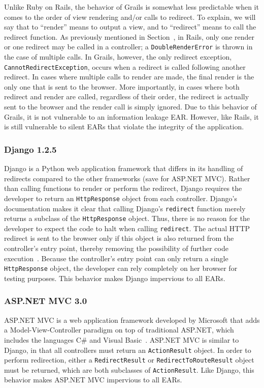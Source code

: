 Unlike Ruby on Rails, the behavior of Grails is somewhat less predictable
when it comes to the order of view rendering and/or calls to redirect. To
explain, we will say that to ``render'' means to output a view, and to
``redirect'' means to call the redirect function. As previously mentioned
in Section~, in Rails, only one render or one redirect may be
called in a controller; a \texttt{DoubleRenderError} is thrown in the case
of multiple calls. In Grails, however, the only redirect exception,
\texttt{CannotRedirectException}, occurs when a redirect is called
following another redirect. In cases where multiple calls to render are
made, the final render is the only one that is sent to the browser. More
importantly, in cases where both redirect and render are called, regardless
of their order, the redirect is actually sent to the browser and the render
call is simply ignored. Due to this behavior of Grails, it is not
vulnerable to an information leakage EAR. However, like Rails, it is still
vulnerable to silent EARs that violate the integrity of the application.

\subsubsection{Django 1.2.5}
Django is a Python web application framework that differs in its handling of
redirects compared to the other frameworks (save for ASP.NET
MVC). Rather than calling functions to render or perform the redirect, Django
requires the developer to return an \texttt{HttpResponse} object from each
controller. Django's documentation makes it clear that calling Django's
\texttt{redirect} function merely returns a subclass of the
\texttt{HttpResponse} object. Thus, there is no reason for the developer to
expect the code to halt when calling \texttt{redirect}. The actual HTTP
redirect is sent to the browser only if this object is also returned from the
controller's entry point, thereby removing the possibility of further code
execution~\cite{django-redirect}. Because the controller's entry
point can only return a single \texttt{HttpResponse} object, the developer can
rely completely on her browser for testing purposes. This behavior makes
Django impervious to all EARs.

\subsubsection{ASP.NET MVC 3.0}
ASP.NET MVC is a web application framework developed by Microsoft that adds a
Model-View-Controller paradigm on top of traditional ASP.NET, which includes
the languages C\# and Visual Basic~\cite{asp-net-mvc}. ASP.NET MVC is similar
to Django, in that all controllers must return an \texttt{ActionResult}
object. In order to perform redirection, either a \texttt{RedirectResult} or
\texttt{RedirectToRouteResult} object must be returned, which are both
subclasses of \texttt{ActionResult}. Like Django, this behavior makes ASP.NET
MVC impervious to all EARs.

